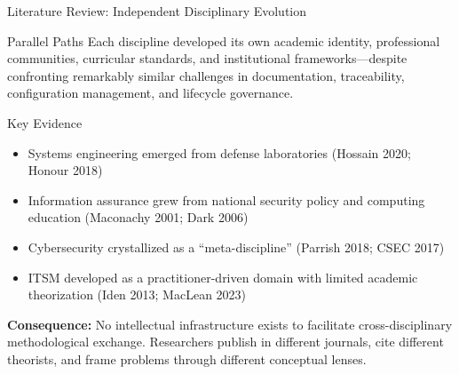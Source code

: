 \documentclass{beamer}
\begin{document}
\begin{frame}[allowframebreaks]{Literature Review: Independent Disciplinary Evolution}
  \begin{block}{Parallel Paths}
    Each discipline developed its own academic identity, professional communities, curricular standards, and institutional frameworks---despite confronting remarkably similar challenges in documentation, traceability, configuration management, and lifecycle governance.
  \end{block}

  \begin{block}{Key Evidence}
    \begin{itemize}
      \item Systems engineering emerged from defense laboratories (Hossain 2020; Honour 2018)
      \item Information assurance grew from national security policy and computing education (Maconachy 2001; Dark 2006)
      \item Cybersecurity crystallized as a ``meta-discipline'' (Parrish 2018; CSEC 2017)
      \item ITSM developed as a practitioner-driven domain with limited academic theorization (Iden 2013; MacLean 2023)
    \end{itemize}
  \end{block}

  \vspace{0.2cm}
  \textbf{Consequence:} No intellectual infrastructure exists to facilitate cross-disciplinary methodological exchange. Researchers publish in different journals, cite different theorists, and frame problems through different conceptual lenses.
\end{frame}
\end{document}
